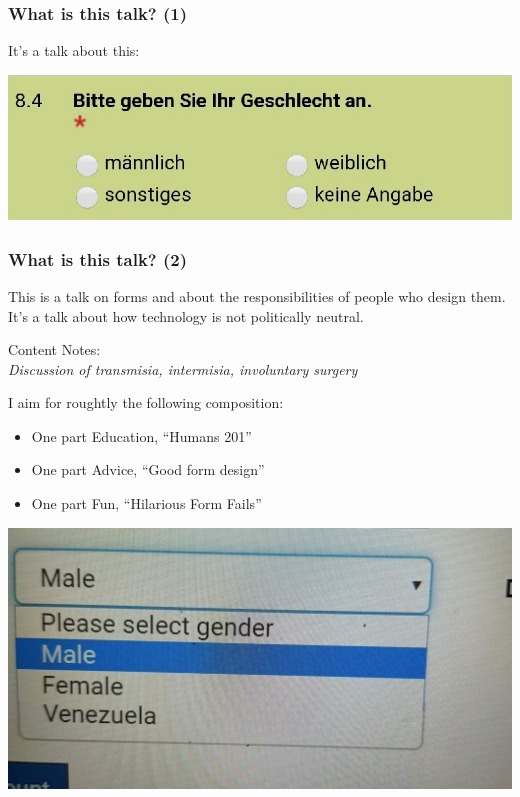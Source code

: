 \documentclass[aspectratio=169,x11names]{beamer}
\begin{document}
\begin{frame}
\frametitle{What is this talk? (1)}
\large
It's a talk about this:\medskip

\begin{center}
\includegraphics[scale=0.45]{images/Simba_01}
\end{center}
\end{frame}

\begin{frame}
\frametitle{What is this talk? (2)}
\large

This is a talk on forms and about the responsibilities of people who design them. It's a talk about how technology is not politically neutral.

\pause\bigskip

\begin{center}
Content Notes:\\
\emph{Discussion of transmisia, intermisia, involuntary surgery}
\end{center}

\pause\bigskip

I aim for roughtly the following composition:

\begin{itemize}
\item One part Education, ``Humans 201''
\item One part Advice, ``Good form design''
\item One part Fun, ``Hilarious Form Fails''
\end{itemize}
\end{frame}

\begin{frame}
\begin{center}
\includegraphics[scale=0.3]{images/ineffyble_01} 
\end{center}
\end{frame}
\end{document}
